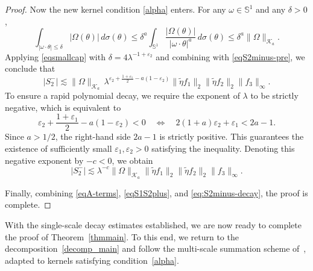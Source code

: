 \documentclass[11pt]{amsart}
\begin{document}
\begin{proof}
	Now the new kernel condition \eqref{alpha} enters. For any $\omega\in\mathbb S^1$ and any $\delta>0$,
	\begin{equation}\label{eqsmallcap}
		\int_{|\omega\cdot\theta|\le \delta}|\Omega(\theta)|\,d\sigma(\theta) \le \delta^a \int_{\mathbb S^1}\frac{|\Omega(\theta)|}{|\omega\cdot\theta|^a}\,d\sigma(\theta) \le \delta^a \|\Omega\|_{\mathcal K_a}.
	\end{equation}
	Applying \eqref{eqsmallcap} with $\delta=4\lambda^{-1+\varepsilon_2}$ and combining with \eqref{eqS2minus-pre}, we conclude that
	\begin{equation}\label{eqS2minus-final}
		|S_2^-| \lesssim \|\Omega\|_{\mathcal K_a}\, \lambda^{\varepsilon_2+\frac{1+\varepsilon_1}{2}-a(1-\varepsilon_2)} \|\widetilde\eta f_1\|_2\|\widetilde\eta f_2\|_2\|f_3\|_\infty.
	\end{equation}
	To ensure a rapid polynomial decay, we require the exponent of $\lambda$ to be strictly negative, which is equivalent to
	\[
	\varepsilon_2 + \frac{1+\varepsilon_1}{2} - a(1-\varepsilon_2) < 0 \quad \iff \quad 2(1+a)\varepsilon_2 + \varepsilon_1 < 2a - 1.
	\]
	Since $a > 1/2$, the right-hand side $2a - 1$ is strictly positive. This guarantees the existence of sufficiently small $\varepsilon_1, \varepsilon_2 > 0$ satisfying the inequality. Denoting this negative exponent by $-c < 0$, we obtain
	\begin{equation}\label{eq:S2minus-decay}
		|S_2^-| \lesssim \lambda^{-c}\|\Omega\|_{\mathcal K_a}\|\widetilde\eta f_1\|_2\|\widetilde\eta f_2\|_2\|f_3\|_\infty.
	\end{equation}
	
	Finally, combining \eqref{eqA-terms}, \eqref{eqS1S2plus}, and \eqref{eq:S2minus-decay}, the proof is complete.
\end{proof}

With the single-scale decay estimates established, we are now ready to complete the proof of Theorem~\ref{thmmain}. To this end, we return to the decomposition~\eqref{decomp_main} and follow the multi-scale summation scheme of~\cite[Section~5]{bhojak2025alternate}, adapted to kernels satisfying condition~\eqref{alpha}.
\end{document}
